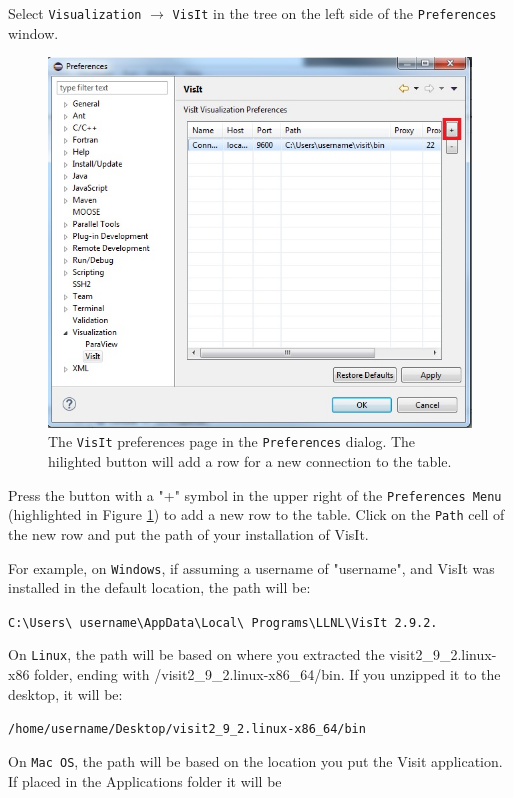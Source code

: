 Select \texttt{Visualization} $\rightarrow$ \texttt{VisIt} in the tree on the
left side of the \texttt{Preferences} window.

\begin{figure}[!h]
\includegraphics[width=12cm]{images/VisualizationPreferences}
\centering
\caption{The \texttt{VisIt} preferences page in the \texttt{Preferences}
dialog. The hilighted button will add a row for a new connection to the table.}
\label{fig:visualizationpreferences}
\end{figure}


Press the button with a "+" symbol in the upper right of the
\texttt{Preferences Menu} (highlighted in Figure
\ref{fig:visualizationpreferences}) to add a new row to the table.
Click on the \texttt{Path} cell of the new row and put the path of your installation of VisIt.

For example, on \texttt{Windows}, if assuming a username of "username", and
VisIt was installed in the default location, the path will be:

\texttt{C:\textbackslash Users\textbackslash
username\textbackslash AppData\textbackslash Local\textbackslash
Programs\textbackslash LLNL\textbackslash VisIt 2.9.2.}

On \texttt{Linux}, the path will be based on where you extracted the 
visit2\_9\_2.linux-x86 folder, ending with /visit2\_9\_2.linux-x86\_64/bin. If
you unzipped it to the desktop, it will be:
 
\texttt{/home/username/Desktop/visit2\_9\_2.linux-x86\_64/bin}

On \texttt{Mac OS}, the path will be based on the location you put the Visit
application. If placed in the Applications folder it will be

